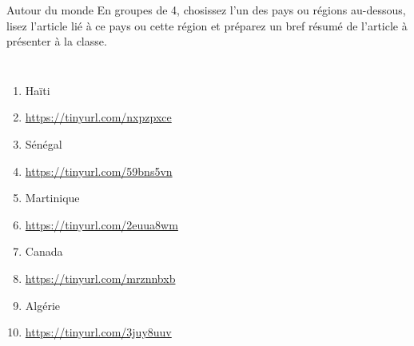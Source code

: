 \begin{frame}{Autour du monde}
  \footnotesize
  En groupes de 4, chosissez l'un des pays ou régions au-dessous, lisez l'article lié à ce pays ou cette région et préparez un bref résumé  de l'article à présenter à la classe.
  \begin{columns}
      \begin{enumerate}
        \item Haïti
          \item[] \href{https://tinyurl.com/nxpzpxce}{https://tinyurl.com/nxpzpxce}
        \item Sénégal
          \item[] \href{https://tinyurl.com/59bns5vn}{https://tinyurl.com/59bns5vn}
        \item Martinique
          \item[] \href{https://tinyurl.com/2euua8wm}{https://tinyurl.com/2euua8wm}
        \item Canada
          \item[] \href{https://tinyurl.com/mrznnbxb}{https://tinyurl.com/mrznnbxb}
        \item Algérie
          \item[] \href{https://tinyurl.com/3juy8uuv}{https://tinyurl.com/3juy8uuv}
      \end{enumerate}
  \end{columns}
\end{frame}